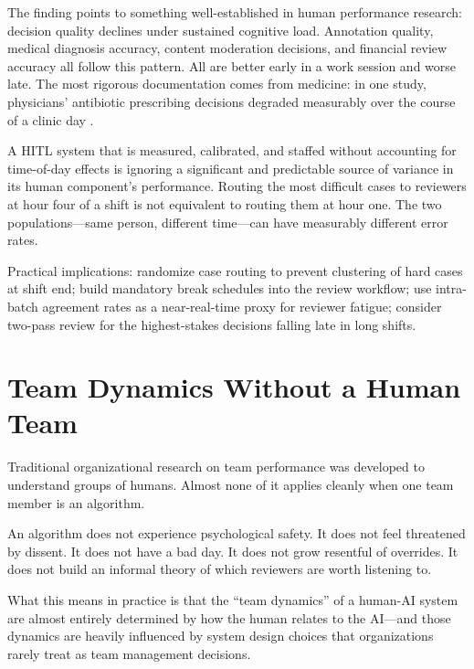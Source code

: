 The finding points to something well-established in human performance research: decision quality declines under sustained cognitive load. Annotation quality, medical diagnosis accuracy, content moderation decisions, and financial review accuracy all follow this pattern. All are better early in a work session and worse late. The most rigorous documentation comes from medicine: in one study, physicians' antibiotic prescribing decisions degraded measurably over the course of a clinic day \autocite{linder2014time}.

\begin{cautionbox}
A HITL system that is measured, calibrated, and staffed without accounting for time-of-day effects is ignoring a significant and predictable source of variance in its human component's performance. Routing the most difficult cases to reviewers at hour four of a shift is not equivalent to routing them at hour one. The two populations---same person, different time---can have measurably different error rates.
\end{cautionbox}

Practical implications: randomize case routing to prevent clustering of hard cases at shift end; build mandatory break schedules into the review workflow; use intra-batch agreement rates as a near-real-time proxy for reviewer fatigue; consider two-pass review for the highest-stakes decisions falling late in long shifts.

\section{Team Dynamics Without a Human Team}

Traditional organizational research on team performance was developed to understand groups of humans. Almost none of it applies cleanly when one team member is an algorithm.

An algorithm does not experience psychological safety. It does not feel threatened by dissent. It does not have a bad day. It does not grow resentful of overrides. It does not build an informal theory of which reviewers are worth listening to.

What this means in practice is that the ``team dynamics'' of a human-AI system are almost entirely determined by how the human relates to the AI---and those dynamics are heavily influenced by system design choices that organizations rarely treat as team management decisions.

